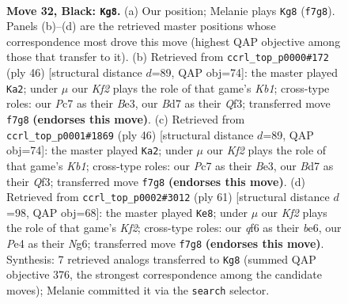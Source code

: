 \documentclass[11pt]{article}
\begin{document}
\clearpage

\begin{figure}[p]\centering
\begin{subfigure}{0.46\textwidth}\centering
\resizebox{\linewidth}{!}{%
\newchessgame
\chessboard[
  setfen={r1r5/pppb1k2/2n2Q2/qP6/3Pp3/6P1/8/RNB2RK1 b - - 0 32},
  showmover=false,
  pgfstyle=straightmove, color=movearrow, markmove={f7-g8}
]}
\caption{}
\end{subfigure}\hfill
\begin{subfigure}{0.46\textwidth}\centering
\resizebox{\linewidth}{!}{%
\newchessgame
\chessboard[
  setfen={2r1r1k1/1p3p2/p2b2p1/3p1NP1/7P/1P2BQ2/1Pq5/1K1R2R1 w - - 0 24},
  showmover=false,
  pgfstyle=straightmove, color=movearrow, markmove={b1-a2}
]}
\caption{}
\end{subfigure}
\\[4pt]
\begin{subfigure}{0.46\textwidth}\centering
\resizebox{\linewidth}{!}{%
\newchessgame
\chessboard[
  setfen={2r1r1k1/1p3p2/p2b2p1/3p1NP1/7P/1P2BQ2/1Pq5/1K1R2R1 w - - 0 24},
  showmover=false,
  pgfstyle=straightmove, color=movearrow, markmove={b1-a2}
]}
\caption{}
\end{subfigure}\hfill
\begin{subfigure}{0.46\textwidth}\centering
\resizebox{\linewidth}{!}{%
\newchessgame
\chessboard[
  setfen={8/5kr1/2p1B1np/1bN1P3/1pp2P1q/8/1P4P1/r2QR1K1 b - - 3 31},
  showmover=false,
  pgfstyle=straightmove, color=movearrow, markmove={f7-e8}
]}
\caption{}
\end{subfigure}
\caption{\textbf{Move 32, Black: \texttt{Kg8}.} (a) Our position; Melanie plays \texttt{Kg8} (\texttt{f7g8}). Panels (b)--(d) are the retrieved master positions whose correspondence most drove this move (highest QAP objective among those that transfer to it). (b) Retrieved from \texttt{ccrl\_top\_p0000\#172} (ply 46) [structural distance $d$=89, QAP obj=74]: the master played \texttt{Ka2}; under $\mu$ our \emph{Kf2} plays the role of that game's \emph{Kb1}; cross-type roles: our \emph{P}c7 as their \emph{B}e3, our \emph{B}d7 as their \emph{Q}f3; transferred move \texttt{f7g8} \textbf{(endorses this move)}. (c) Retrieved from \texttt{ccrl\_top\_p0001\#1869} (ply 46) [structural distance $d$=89, QAP obj=74]: the master played \texttt{Ka2}; under $\mu$ our \emph{Kf2} plays the role of that game's \emph{Kb1}; cross-type roles: our \emph{P}c7 as their \emph{B}e3, our \emph{B}d7 as their \emph{Q}f3; transferred move \texttt{f7g8} \textbf{(endorses this move)}. (d) Retrieved from \texttt{ccrl\_top\_p0002\#3012} (ply 61) [structural distance $d$=98, QAP obj=68]: the master played \texttt{Ke8}; under $\mu$ our \emph{Kf2} plays the role of that game's \emph{Kf2}; cross-type roles: our \emph{q}f6 as their \emph{b}e6, our \emph{P}e4 as their \emph{N}g6; transferred move \texttt{f7g8} \textbf{(endorses this move)}. Synthesis: 7 retrieved analogs transferred to \texttt{Kg8} (summed QAP objective 376, the strongest correspondence among the candidate moves); Melanie committed it via the \texttt{search} selector.}
\label{fig:thought-m63}
\end{figure}
\end{document}
